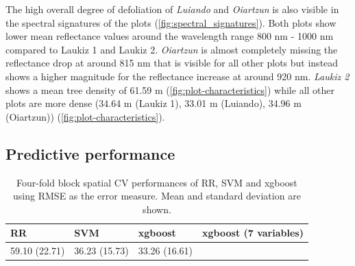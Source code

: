 \documentclass[review]{elsarticle}
\begin{document}
\noindent The high overall degree of defoliation of \textit{Luiando} and \textit{Oiartzun} is also visible in the spectral signatures of the plots (\autoref{fig:spectral_signatures}).
Both plots show lower mean reflectance values around the wavelength range 800 nm - 1000 nm compared to Laukiz 1 and Laukiz 2.
\textit{Oiartzun} is almost completely missing the reflectance drop at around 815 nm that is visible for all other plots but instead shows a higher magnitude for the reflectance increase at around 920 nm.
\textit{Laukiz 2} shows a mean tree density of 61.59 m (\autoref{fig:plot-characteristics}) while all other plots are more dense (34.64 m (Laukiz 1), 33.01 m (Luiando), 34.96 m (Oiartzun)) (\autoref{fig:plot-characteristics}).

\subsection{Predictive performance}

\begin{table}[t!]
\centering
\caption[t]{Four-fold block spatial \ac{CV} performances of RR, SVM and xgboost using \ac{RMSE} as the error measure.
	Mean and standard deviation are shown.}
\begingroup\footnotesize
\begin{tabular}{llll}
	RR            & SVM           & xgboost       & xgboost (7 variables) \\
	\hline
	59.10 (22.71) & 36.23 (15.73) & 33.26 (16.61) &                       \\
	\bottomrule
\end{tabular}
\endgroup
\label{tab:model_comparison}
\end{table}
\end{document}

